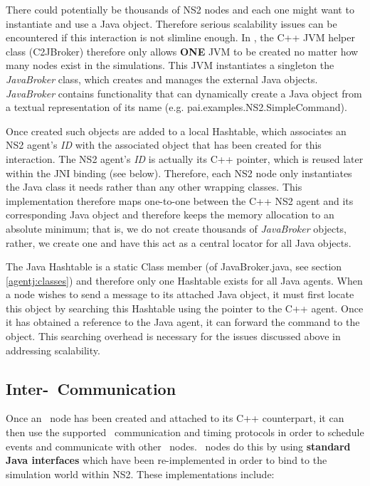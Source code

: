 
There could potentially be thousands of NS2 nodes and each one 
might want to instantiate and use a Java object.  Therefore serious 
scalability issues can be encountered if this interaction is not 
slimline enough. In \agentj, the C++ JVM helper class (C2JBroker) therefore
only allows \textbf{ONE} JVM to be  created no matter how many 
nodes exist in the simulations.  This JVM instantiates a singleton
the \emph{JavaBroker} class, which creates and manages the external 
Java objects. \emph{JavaBroker} contains functionality that can 
dynamically create a Java object from a textual representation of its
name (e.g. pai.examples.NS2.SimpleCommand). 

Once created such objects are added to a local Hashtable, which associates 
an NS2 agent's \emph{ID} with the associated object that has been created for this 
interaction.  The NS2 agent's \emph{ID} is actually its C++ pointer, which 
is reused later within the JNI binding (see below). Therefore, 
each NS2 node only instantiates the Java class it needs
rather than any other wrapping classes. This implementation therefore 
maps one-to-one between the C++ NS2 agent and its corresponding 
Java object and therefore keeps the memory allocation to an absolute 
minimum; that is, we do not create thousands of 
\emph{JavaBroker} objects, rather, we create one and have this act as
a central locator for all Java objects. 

The Java Hashtable is a static Class member (of JavaBroker.java, 
see section \ref{agentj:classes}) and therefore only one Hashtable exists for 
all Java agents.  When a node wishes to send a message to its attached 
Java object, it must first locate this object by searching this Hashtable using
the pointer to the C++ agent.  Once it has obtained a reference to the 
Java agent, it can forward the command to the object.  This searching
overhead is necessary for the issues discussed above in addressing
scalability. 

\subsection{Inter-\agentj~Communication}

Once an \agentj~node has been created and attached to its C++ 
counterpart, it can then use the supported \agentj~communication
and timing protocols in order to schedule events and 
communicate with other \agentj~nodes. \agentj~nodes do this
by using \textbf{standard Java interfaces} which have been 
re-implemented in order to bind to the simulation world within 
NS2. These implementations include:

